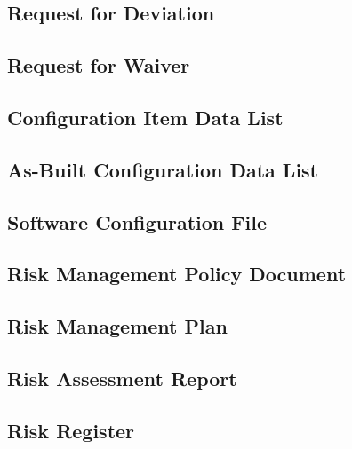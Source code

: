 \subsection{Request for Deviation}
\label{sec:Request for Deviation}


\subsection{Request for Waiver}
\label{sec:Request for Waiver}


\subsection{Configuration Item Data List}
\label{sec:Configuration Item Data List}


\subsection{As-Built Configuration Data List}
\label{sec:As-Built Configuration Data List}


\subsection{Software Configuration File}
\label{sec:Software Configuration File}


\subsection{Risk Management Policy Document}
\label{sec:Risk Management Policy Document}


\subsection{Risk Management Plan}
\label{sec:Risk Management Plan}


\subsection{Risk Assessment Report}
\label{sec:Risk Assessment Report}


\subsection{Risk Register}
\label{sec:Risk Register}


